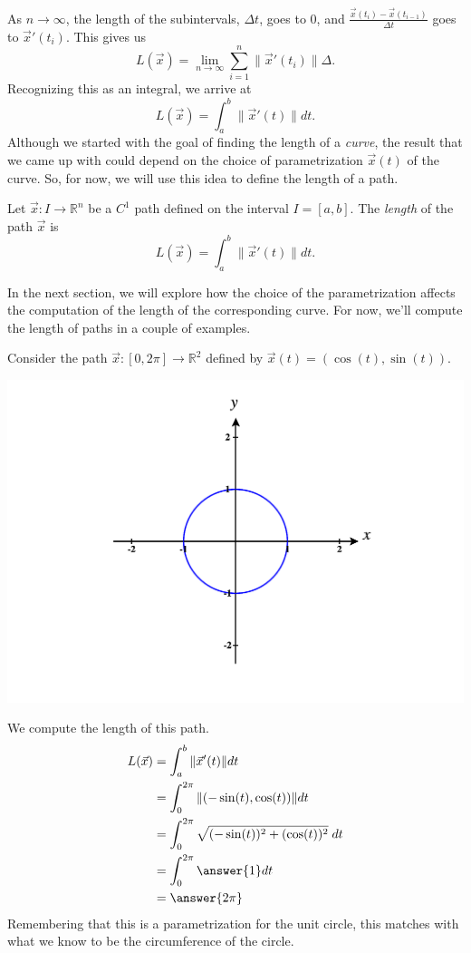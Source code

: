 \documentclass{ximera}
\begin{document}
As $n\rightarrow \infty$, the length of the subintervals, $\Delta t$, goes to $0$, and $\frac{\vec{x}(t_i)-\vec{x}(t_{i-1})}{\Delta t}$ goes to $\vec{x}'(t_i)$. This gives us
\[
L(\vec{x})=\lim_{n\rightarrow\infty}\sum_{i=1}^n \|\vec{x}'(t_i)\|\Delta.
\]
Recognizing this as an integral, we arrive at
\[
L(\vec{x}) = \int_a^b\|\vec{x}'(t)\|dt.
\]
Although we started with the goal of finding the length of a \emph{curve}, the result that we came up with could depend on the choice of parametrization $\vec{x}(t)$ of the curve. So, for now, we will use this idea to define the length of a path.

\begin{definition}
Let $\vec{x}:I\rightarrow\mathbb{R}^n$ be a $C^1$ path defined on the interval $I=[a,b]$. The \emph{length} of the path $\vec{x}$ is 
\[
L(\vec{x}) = \int_a^b\|\vec{x}'(t)\|dt.
\]
\end{definition} 

In the next section, we will explore how the choice of the parametrization affects the computation of the length of the corresponding curve. For now, we'll compute the length of paths in a couple of examples.

\begin{example}
Consider the path $\vec{x}:[0,2\pi]\rightarrow\mathbb{R}^2$ defined by $\vec{x}(t) = (\cos(t),\sin(t))$.

\begin{image}
\includegraphics[width = \textwidth]{CalcPlot3D-unit_circle}
\end{image}

We compute the length of this path.
\begin{align*}
L(\vec{x}) &= \int_a^b\|\vec{x}'(t)\|dt\\
&= \int_{0}^{2\pi}\|(-\sin(t),\cos(t))\|dt\\
&= \int_{0}^{2\pi} \sqrt{(-\sin(t))^2 + (\cos(t))^2}\;dt\\
&= \int_{0}^{2\pi} \answer{1}dt\\
& = \answer{2\pi}
\end{align*}
Remembering that this is a parametrization for the unit circle, this matches with what we know to be the circumference of the circle.
\end{example}
\end{document}
